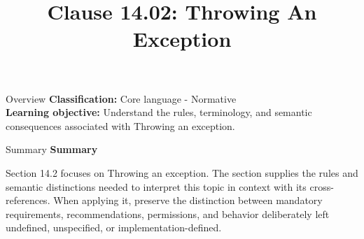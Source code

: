 \documentclass[10pt,letterpaper]{article}
\title{Clause 14.02: Throwing An Exception}
\author{}
\date{}
\begin{document}
\maketitle
\begin{CornellOverviewBox}{Overview}
\textbf{Classification:} Core language - Normative\\[2pt]
\textbf{Learning objective:} Understand the rules, terminology, and semantic consequences associated with Throwing an exception.
\end{CornellOverviewBox}\begin{CornellSummaryBox}{Summary}
{\sffamily\bfseries\color{Accent} Summary}\par\vspace{3pt}Section 14.2 focuses on Throwing an exception. The section supplies the rules and semantic distinctions needed to interpret this topic in context with its cross-references. When applying it, preserve the distinction between mandatory requirements, recommendations, permissions, and behavior deliberately left undefined, unspecified, or implementation-defined.
\end{CornellSummaryBox}
\end{document}
